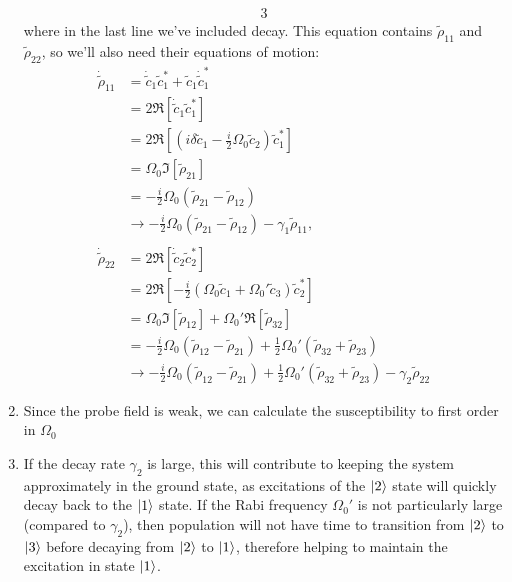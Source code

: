 \documentclass[12pt]{article}
\begin{document}
\begin{enumerate}[label=(\alph*)]
\begin{alignat*}{3}
    \end{alignat*}
    where in the last line we've included decay. This equation contains $\tilde{\rho}_{11}$ and $\tilde{\rho}_{22}$, so we'll also need their equations of motion:
    \begin{align*}
        \dot{\tilde{\rho}}_{11} &= \dot{\tilde{c}}_1\tilde{c}_1^* + \tilde{c}_1\dot{\tilde{c}}_1^* \\
        &= 2\Re[\dot{\tilde{c}}_1\tilde{c}_1^*] \\
        &= 2\Re\left[\left(i\delta\tilde{c}_1 - \frac{i}{2}\Omega_0\tilde{c}_2\right)\tilde{c}_1^*\right] \\
        &= \Omega_0 \Im\left[\tilde{\rho}_{21}\right] \\
        &= -\frac{i}{2}\Omega_0\left(\tilde{\rho}_{21} - \tilde{\rho}_{12}\right) \\
        &\to -\frac{i}{2}\Omega_0\left(\tilde{\rho}_{21} - \tilde{\rho}_{12}\right) - \gamma_1\tilde{\rho}_{11},
        \\ \\
        \dot{\tilde{\rho}}_{22} &= 2\Re[\dot{\tilde{c}}_2\tilde{c}_2^*] \\
        &= 2\Re\left[-\frac{i}{2}\left(\Omega_0\tilde{c}_1 + \Omega_0'\tilde{c}_3\right)\tilde{c}_2^*\right] \\
        &= \Omega_0\Im\left[\tilde{\rho}_{12}\right] + \Omega_0'\Re\left[\tilde{\rho}_{32}\right] \\
        &= -\frac{i}{2}\Omega_0\left(\tilde{\rho}_{12} - \tilde{\rho}_{21}\right) + \frac{1}{2}\Omega_0'\left(\tilde{\rho}_{32} + \tilde{\rho}_{23}\right) \\
        &\to -\frac{i}{2}\Omega_0\left(\tilde{\rho}_{12} - \tilde{\rho}_{21}\right) + \frac{1}{2}\Omega_0'\left(\tilde{\rho}_{32} + \tilde{\rho}_{23}\right) - \gamma_2\tilde{\rho}_{22}
    \end{align*}
    \item Since the probe field is weak, we can calculate the susceptibility to first order in $\Omega_0$
    \item If the decay rate $\gamma_2$ is large, this will contribute to keeping the system approximately in the ground state, as excitations of the $\ket{2}$ state will quickly decay back to the $\ket{1}$ state.
    If the Rabi frequency $\Omega_0'$ is not particularly large (compared to $\gamma_2$), then population will not have time to transition from $\ket{2}$ to $\ket{3}$ before decaying from $\ket{2}$ to $\ket{1}$, therefore helping to maintain the excitation in state $\ket{1}$.

\end{enumerate}
\end{document}
